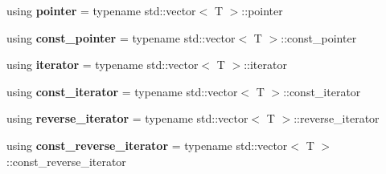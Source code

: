 \begin{DoxyCompactItemize}
using {\bfseries pointer} = typename std\+::vector$<$ T $>$\+::pointer
\item 
\mbox{\label{classdsp_1_1_signal_a4c447e1fee42ad961cab9f49e8a35a17}} 
using {\bfseries const\+\_\+pointer} = typename std\+::vector$<$ T $>$\+::const\+\_\+pointer
\item 
\mbox{\label{classdsp_1_1_signal_a331c750bcc492779d62da3fdb2d90428}} 
using {\bfseries iterator} = typename std\+::vector$<$ T $>$\+::iterator
\item 
\mbox{\label{classdsp_1_1_signal_ac4ce41112babca7c37909c0e68f8c7d1}} 
using {\bfseries const\+\_\+iterator} = typename std\+::vector$<$ T $>$\+::const\+\_\+iterator
\item 
\mbox{\label{classdsp_1_1_signal_ab10337e87c9c454b2c71d4f589e2e3e0}} 
using {\bfseries reverse\+\_\+iterator} = typename std\+::vector$<$ T $>$\+::reverse\+\_\+iterator
\item 
\mbox{\label{classdsp_1_1_signal_af1cd92e5bf0606e024569ca98abd3600}} 
using {\bfseries const\+\_\+reverse\+\_\+iterator} = typename std\+::vector$<$ T $>$\+::const\+\_\+reverse\+\_\+iterator
\end{DoxyCompactItemize}
